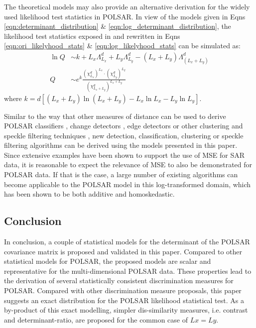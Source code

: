 \documentclass[journal]{IEEEtran}
\begin{document}
The theoretical models may also provide an alternative derivation for the widely used likelihood test statistics in POLSAR.
In view of the models given in Eqns \ref{eqn:determinant_distribution} \& \ref{eqn:log_determinant_distribution},
  the likelihood test statistics exposed in \cite{Conradsen_2003_TGRS_4} and rewritten in Eqns \ref{eqn:ori_likelyhood_stats} \& \ref{eqn:log_likelyhood_stats}
can be simulated as:
\begin{align*}
  \ln{Q} &\sim  k + L_x \Lambda^d_{L_x} + L_y \Lambda^d_{L_y} - (L_x + L_y) \Lambda^d_{(L_x + L_y)} \\
  Q &\sim e^k \frac{(\chi^d_{L_x})^{L_x} \cdot (\chi^d_{L_y})^{L_y}}{(\chi^d_{L_x + L_y})^{L_x + L_y}}   
\end{align*}
where $k = d \left[ (L_x + L_y) \ln(L_x + L_y) - L_x \ln{L_x} - L_y \ln{L_y} \right]$.

Similar to the way that other measures of distance can be used to derive POLSAR classifiers \cite{Lee_1999_TGRS}, change detectors \cite{Conradsen_2003_TGRS_4}, edge detectors \cite{Schou_2003_TGRS_20} or other clustering and speckle filtering techniques \cite{Le_2010_ACRS} \cite{Le_2011_ACRS}, 
new detection, classification, clustering or speckle filtering algorithms can be derived using the models presented in this paper.
Since extensive examples have been shown to support the use of MSE for SAR data,
  it is reasonable to expect the relevance of MSE to also be demonstrated for POLSAR data.
If that is the case, a large number of existing algorithms can become applicable to the POLSAR model in this log-transformed domain,
  which has been shown to be both additive and homoskedastic.   

\subsection{Conclusion}
\label{sec:conclusion}

In conclusion, a couple of statistical models for the determinant of the POLSAR covariance matrix is proposed and validated in this paper.
Compared to other statistical models for POLSAR, the proposed models are scalar and representative for the multi-dimensional POLSAR data.
These properties lead to the derivation of several statistically consistent discrimination measures for POLSAR.
Compared with other discrimination measure proposals, this paper suggests an exact distribution for the POLSAR likelihood statistical test.
As a by-product of this exact modelling, simpler dis-similarity measures, i.e. contrast and determinant-ratio, are proposed for the common case of $Lx=Ly$.
\end{document}
